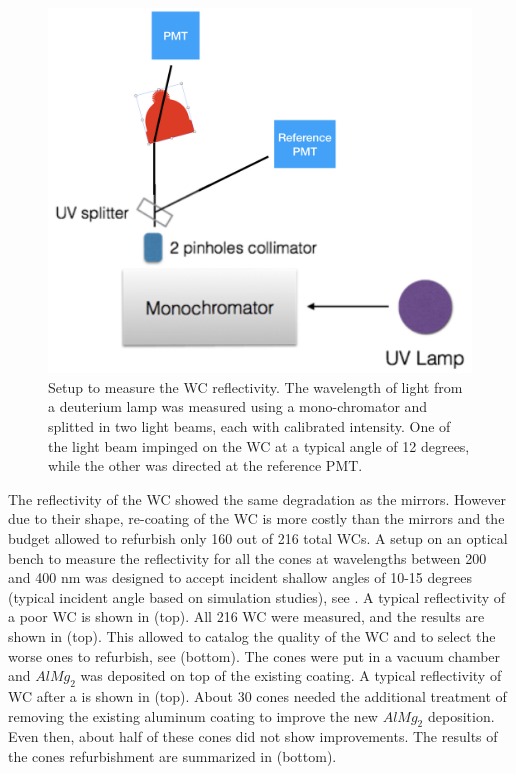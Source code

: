\begin{figure}
	\centering
	\includegraphics[width=0.95\columnwidth,keepaspectratio]{img/wcSetup.png}
	\caption{Setup to measure the WC reflectivity. The wavelength of light from a deuterium lamp was measured using a mono-chromator and splitted in two
            light beams, each with calibrated intensity. One of the light beam impinged on the WC at a typical angle of 12 degrees,
            while the other was directed at the reference PMT. }
	\label{fig:wcSetup}
\end{figure}

The reflectivity of the WC showed the same degradation as the mirrors. However due to their shape, re-coating of the WC is more costly than the mirrors and the budget allowed
to refurbish only 160 out of 216 total WCs.
A setup on an optical bench to measure the reflectivity for all the cones at wavelengths between 200 and 400 nm was designed to accept incident
shallow angles of 10-15 degrees (typical incident angle based on simulation studies), see . A typical reflectivity of a poor WC is shown in  (top).
All 216 WC were measured, and the results are shown in  (top). This allowed to catalog the quality of the WC and to select the worse ones to refurbish,
see  (bottom).
The cones were put in a vacuum chamber and $AlMg_2$ was deposited on top of the existing coating. A typical reflectivity of WC after a is shown in  (top).
About 30 cones needed the additional treatment of removing the existing aluminum coating to improve the new $AlMg_2$ deposition. Even then, about half of these cones did not show improvements.
The results of the cones refurbishment are summarized in  (bottom).


